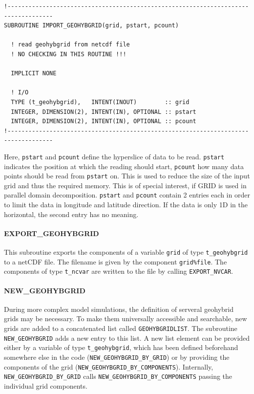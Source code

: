 \documentclass[11pt,twoside]{article}
\begin{document}
\begin{verbatim}
!-----------------------------------------------------------------------------------
SUBROUTINE IMPORT_GEOHYBGRID(grid, pstart, pcount)

  ! read geohybgrid from netcdf file
  ! NO CHECKING IN THIS ROUTINE !!!

  IMPLICIT NONE

  ! I/O
  TYPE (t_geohybgrid),   INTENT(INOUT)        :: grid
  INTEGER, DIMENSION(2), INTENT(IN), OPTIONAL :: pstart
  INTEGER, DIMENSION(2), INTENT(IN), OPTIONAL :: pcount
!-----------------------------------------------------------------------------------
\end{verbatim}
Here, \verb|pstart| and \verb|pcount| define the hyperslice
of data to be read. \verb|pstart| indicates the position at which the reading
should start,  \verb|pcount| how many data points should be read from 
 \verb|pstart| on. This is used to reduce the size of the input grid and
thus the required memory.  This is of special interest, if GRID is used in 
parallel domain decomposition.  \verb|pstart| and \verb|pcount|
contain 2 entries 
each in order to limit the data in longitude and latitude direction.
If the data is only 1D in the horizontal, the second entry has
no meaning.

\paragraph{EXPORT\_GEOHYBGRID\\\label{EXPGRID}}
This subroutine exports the components of a variable \verb|grid| of 
type \verb|t_geohybgrid| to a netCDF file.
The filename is given by the component \verb|grid%file|. The components 
 of type \verb|t_ncvar| are written to the file by calling
\verb|EXPORT_NVCAR|.
\paragraph{NEW\_GEOHYBGRID\\\label{NEWGRID}}
During more complex model simulations, the definition of serveral
geohybrid grids may be necessary. To make them universally accessible and 
searchable, new grids are added to a concatenated list
called \verb|GEOHYBGRIDLIST|. 
The subroutine  \verb|NEW_GEOHYBGRID| adds a new entry to this list.
A new list element can be provided either by a variable of type 
\verb|t_geohybgrid|, which has been defined beforehand somewhere else in the
code (\verb|NEW_GEOHYBGRID_BY_GRID|) or by providing the components of 
the grid (\verb|NEW_GEOHYBGRID_BY_COMPONENTS|).
Internally, \verb|NEW_GEOHYBGRID_BY_GRID| calls
  \verb|NEW_GEOHYBGRID_BY_COMPONENTS| passing the individual grid
  components. 
\end{document}
